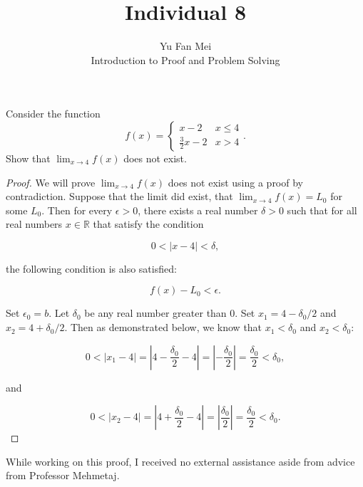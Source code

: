 \documentclass[12pt]{article}
\newenvironment{problem}[2][Problem]{\begin{trivlist}
\item[\hskip \labelsep {\bfseries #1}\hskip \labelsep {\bfseries #2.}]}{\end{trivlist}}
\begin{document}

\title{Individual 8}%
\author{Yu Fan Mei\\
	Introduction to Proof and Problem Solving} %

\maketitle

\begin{problem}{1}
    Consider the function
    \begin{equation*}
    f(x) =
    \begin{cases}
    x - 2 & x \leq 4\\
    \frac{3}{2}x - 2 & x > 4
    \end{cases}.
    \end{equation*}
    Show that $\lim_{x\to 4} f(x)$ does not exist.
\end{problem}

\begin{proof}
    We will prove $\lim_{x\to 4} f(x) $ does not exist using a proof by contradiction. Suppose that the limit did exist, that $\lim_{x\to 4} f(x) = L_0$ for some $L_0$. Then for every $\epsilon > 0$, there exists a real number $\delta > 0$ such that for all real numbers $x \in \mathbb{R}$ that satisfy the condition

    \[0 < |x - 4| < \delta,\]

    the following condition is also satisfied:

    \[ f(x) - L_0 < \epsilon.\]

    Set $\epsilon_0 = b$. Let $\delta_0$ be any real number greater than 0. Set $x_1 = 4 - \delta_0/2$ and $x_2 = 4 + \delta_0/2$. Then as demonstrated below, we know that $x_1 < \delta_0$ and $x_2 < \delta_0$:
    
    \[ 0 < |x_1 - 4| = | 4 - \frac{\delta_0}{2} - 4| = |- \frac{\delta_0}{2}| = \frac{\delta_0}{2} < \delta_0, \]

    and

    \[ 0 < |x_2 - 4| = | 4 + \frac{\delta_0}{2} - 4| = |\frac{\delta_0}{2}| = \frac{\delta_0}{2} < \delta_0. \]

    

    

\end{proof}

\noindent While working on this proof, I received no external assistance aside from advice from Professor Mehmetaj.
\end{document}

